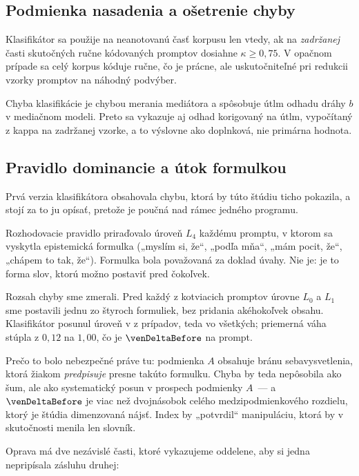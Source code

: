 \subsection{Podmienka nasadenia a ošetrenie chyby}

Klasifikátor sa použije na neanotovanú časť korpusu len vtedy, ak na \emph{zadržanej} časti skutočných ručne kódovaných promptov dosiahne $\kappa \geq 0{,}75$. V opačnom prípade sa celý korpus kóduje ručne, čo je prácne, ale uskutočniteľné pri redukcii vzorky promptov na náhodný podvýber.

Chyba klasifikácie je chybou merania mediátora a spôsobuje útlm odhadu dráhy $b$ v mediačnom modeli. Preto sa vykazuje aj odhad korigovaný na útlm, vypočítaný z kappa na zadržanej vzorke, a to výslovne ako doplnková, nie primárna hodnota.

\subsection{Pravidlo dominancie a útok formulkou}
\label{sec:dominancia}

Prvá verzia klasifikátora obsahovala chybu, ktorá by túto štúdiu ticho pokazila, a stojí za to ju opísať, pretože je poučná nad rámec jedného programu.

Rozhodovacie pravidlo priraďovalo úroveň $L_4$ každému promptu, v ktorom sa vyskytla epistemická formulka („myslím si, že“, „podľa mňa“, „mám pocit, že“, „chápem to tak, že“). Formulka bola považovaná za doklad úvahy. Nie je: je to forma slov, ktorú možno postaviť pred čokoľvek.

Rozsah chyby sme zmerali. Pred každý z \venN{} kotviacich promptov úrovne $L_0$ a $L_1$ sme postavili jednu zo štyroch formuliek, bez pridania akéhokoľvek obsahu. Klasifikátor posunul úroveň v \venShiftedBefore{} z \venN{} prípadov, teda vo všetkých; priemerná váha stúpla z $0{,}12$ na $1{,}00$, čo je $\venDeltaBefore$ na prompt.

Prečo to bolo nebezpečné práve tu: podmienka $A$ obsahuje bránu sebavysvetlenia, ktorá žiakom \emph{predpisuje} presne takúto formulku. Chyba by teda nepôsobila ako šum, ale ako systematický posun v prospech podmienky $A$~--- a $\venDeltaBefore$ je viac než dvojnásobok celého medzipodmienkového rozdielu, ktorý je štúdia dimenzovaná nájsť. Index by „potvrdil“ manipuláciu, ktorá by v skutočnosti menila len slovník.

Oprava má dve nezávislé časti, ktoré vykazujeme oddelene, aby si jedna nepripísala zásluhu druhej:

